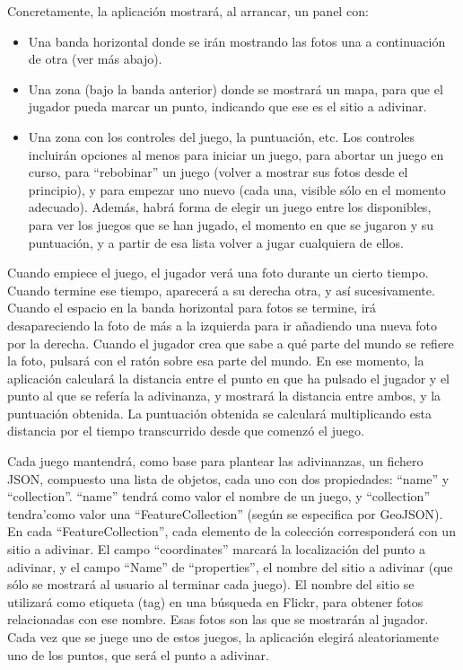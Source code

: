 Concretamente, la aplicación mostrará, al arrancar, un panel con:

\begin{itemize}
\item Una banda horizontal donde se irán mostrando las fotos una a continuación de otra (ver más abajo).
\item Una zona (bajo la banda anterior) donde se mostrará un mapa, para que el jugador pueda marcar un punto, indicando que ese es el sitio a adivinar.
\item Una zona con los controles del juego, la puntuación, etc. Los controles incluirán opciones al menos para iniciar un juego, para abortar un juego en curso, para ``rebobinar'' un juego (volver a mostrar sus fotos desde el principio), y para empezar uno nuevo (cada una, visible sólo en el momento adecuado). Además, habrá forma de elegir un juego entre los disponibles, para ver los juegos que se han jugado, el momento en que se jugaron y su puntuación, y a partir de esa lista volver a jugar cualquiera de ellos.
\end{itemize}

Cuando empiece el juego, el jugador verá una foto durante un cierto tiempo. Cuando termine ese tiempo, aparecerá a su derecha otra, y así sucesivamente. Cuando el espacio en la banda horizontal para fotos se termine, irá desapareciendo la foto de más a la izquierda para ir añadiendo una nueva foto por la derecha. Cuando el jugador crea que sabe a qué parte del mundo se refiere la foto, pulsará con el ratón sobre esa parte del mundo. En ese momento, la aplicación calculará la distancia entre el punto en que ha pulsado el jugador y el punto al que se refería la adivinanza, y mostrará la distancia entre ambos, y la puntuación obtenida. La puntuación obtenida se calculará multiplicando esta distancia por el tiempo transcurrido desde que comenzó el juego.

Cada juego mantendrá, como base para plantear las adivinanzas, un fichero JSON, compuesto una lista de objetos, cada uno con dos propiedades: ``name'' y ``collection''. ``name'' tendrá como valor el nombre de un juego, y ``collection'' tendra'como valor una ``FeatureCollection'' (según se especifica por GeoJSON). En cada ``FeatureCollection'', cada elemento de la colección corresponderá con un sitio a adivinar. El campo ``coordinates'' marcará la localización del punto a adivinar, y el campo ``Name'' de ``properties'', el nombre del sitio a adivinar (que sólo se mostrará al usuario al terminar cada juego). El nombre del sitio se utilizará como etiqueta (tag) en una búsqueda en Flickr, para obtener fotos relacionadas con ese nombre. Esas fotos son las que se mostrarán al jugador. Cada vez que se juege uno de estos juegos, la aplicación elegirá aleatoriamente uno de los puntos, que será el punto a adivinar.

